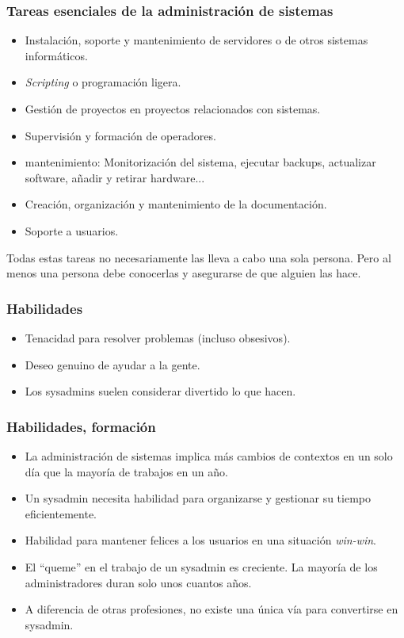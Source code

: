 \documentclass{beamer}
\begin{document}

\begin{frame}
\frametitle{Tareas esenciales de la administración de sistemas}

\begin{itemize}
\item Instalación, soporte y mantenimiento de servidores o de otros sistemas informáticos.
\item \textit{Scripting} o programación ligera. 
\item Gestión de proyectos en proyectos relacionados con sistemas. 
\item Supervisión y formación de operadores. 
\item mantenimiento: Monitorización del sistema, ejecutar backups, actualizar software, añadir y retirar hardware...
\item Creación, organización y mantenimiento de la documentación.
\item Soporte a usuarios.
\end{itemize}

\small

Todas estas tareas no necesariamente las lleva a cabo una sola persona. Pero al menos una persona debe conocerlas y asegurarse de que alguien las hace.

\end{frame}



\begin{frame}
\frametitle{Habilidades}

\begin{itemize}
\item Tenacidad para resolver problemas (incluso obsesivos).
\item Deseo genuino de ayudar a la gente.
\item Los sysadmins suelen considerar divertido lo que hacen.
\end{itemize}
\end{frame}


\begin{frame}
\frametitle{Habilidades, formación}

\begin{itemize}
\item La administración de sistemas implica más cambios de contextos en un solo día que la mayoría de trabajos en un año.
\item Un sysadmin necesita habilidad para organizarse y gestionar su tiempo eficientemente.
\item Habilidad para mantener felices a los usuarios en una situación \textit{win-win}.
\item El ``queme'' en el trabajo de un sysadmin es creciente. La mayoría de los administradores duran solo unos cuantos años.
\item A diferencia de otras profesiones, no existe una única vía para convertirse en sysadmin.
\end{itemize}
\end{frame}
\end{document}
